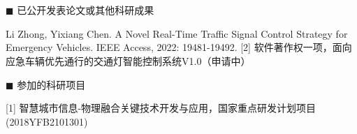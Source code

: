 \newpage
\section*{}
\vskip 5mm

{\heiti $\blacksquare$ 已公开发表论文或其他科研成果}\vskip 5mm
\begin{flushleft}
[1] Li Zhong, Yixiang Chen. A Novel Real-Time Traffic Signal Control Strategy for Emergency Vehicles. IEEE Access, 2022: 19481-19492. 
[2] 软件著作权一项，面向应急车辆优先通行的交通灯智能控制系统V1.0（申请中）

\end{flushleft}

{\heiti $\blacksquare$ 参加的科研项目}\vskip 5mm
\begin{flushleft}
	
[1] 智慧城市信息$\!$-物理融合关键技术开发与应用，国家重点研发计划项目(2018YFB2101301)

	
\end{flushleft}
 